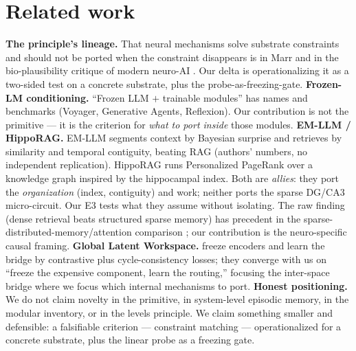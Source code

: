 \documentclass[11pt]{article}
\begin{document}
\section{Related work}
\textbf{The principle's lineage.} That neural mechanisms solve substrate constraints and should not be ported when the constraint disappears is in Marr \citep{marr1982} and in the bio-plausibility critique of modern neuro-AI \citep{jonas2017, lillicrap2019, doerig2023}. Our delta is operationalizing it as a two-sided test on a concrete substrate, plus the probe-as-freezing-gate.
\textbf{Frozen-LM conditioning.} ``Frozen LLM $+$ trainable modules'' has names and benchmarks (Voyager, Generative Agents, Reflexion). Our contribution is not the primitive --- it is the criterion for \emph{what to port inside} those modules.
\textbf{EM-LLM / HippoRAG.} EM-LLM \citep{fountas2025} segments context by Bayesian surprise and retrieves by similarity and temporal contiguity, beating RAG (authors' numbers, no independent replication). HippoRAG \citep{gutierrez2024} runs Personalized PageRank over a knowledge graph inspired by the hippocampal index. Both are \emph{allies}: they port the \emph{organization} (index, contiguity) and work; neither ports the sparse DG/CA3 micro-circuit. Our E3 tests what they assume without isolating. The raw finding (dense retrieval beats structured sparse memory) has precedent in the sparse-distributed-memory/attention comparison \citep{bricken2021}; our contribution is the neuro-specific causal framing.
\textbf{Global Latent Workspace.} \citet{devillers2024} freeze encoders and learn the bridge by contrastive plus cycle-consistency losses; they converge with us on ``freeze the expensive component, learn the routing,'' focusing the inter-space bridge where we focus which internal mechanisms to port.
\textbf{Honest positioning.} We do not claim novelty in the primitive, in system-level episodic memory, in the modular inventory, or in the levels principle. We claim something smaller and defensible: a falsifiable criterion --- constraint matching --- operationalized for a concrete substrate, plus the linear probe as a freezing gate.
\end{document}
